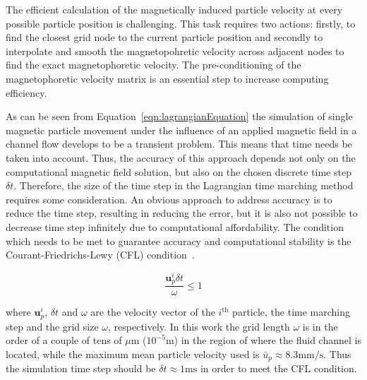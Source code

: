 
The efficient calculation of the magnetically induced particle velocity at every possible particle position is challenging. This task requires two actions: firstly, to find the closest grid node to the current particle position and secondly to interpolate and smooth the magnetopohretic velocity across adjacent nodes to find the exact magnetophoretic velocity. The pre-conditioning of the magnetophoretic velocity matrix is an essential step to increase computing efficiency. 

As can be seen from Equation~\ref{eqn:lagrangianEquation} the simulation of single magnetic particle movement under the influence of an applied magnetic field in a channel flow develops to be a transient problem. This means that time needs be taken into account. Thus, the accuracy of this approach depends not only on the computational magnetic field solution, but also on the chosen discrete time step $\delta t$. Therefore, the size of the time step in the Lagrangian time marching method requires some consideration. An obvious approach to address accuracy is to reduce the time step, resulting in reducing the error, but it is also not possible to decrease time step infinitely due to computational affordability. The condition which needs to be met to guarantee accuracy and computational stability is the Courant-Friedrichs-Lewy (CFL) condition~\cite{Courant1967}. 

\begin{equation}
	\frac{\mathbf{u}_{p}^{i}\delta t}{\omega} \leq 1
	\label{eqn:courantFriedrichsLewy} 
\end{equation}

where $\mathbf{u}_{p}^{i}$, $\delta t$ and $\omega$ are the velocity vector of the $i^{\text{th}}$ particle, the time marching step and the grid size $\omega$, respectively. In this work the grid length $\omega$ is in the order of a couple of tens of $\mu$m ($10^{-5} \text{m}$) in the region of where the fluid channel is located, while the maximum mean particle velocity used is $\bar{u}_{p}\approx 8.3 \text{mm/s}$. Thus the simulation time step should be $\delta t \approx 1 \text{ms}$ in order to meet the CFL condition.

